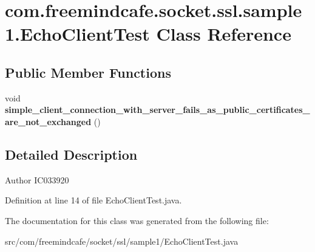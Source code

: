 \hypertarget{classcom_1_1freemindcafe_1_1socket_1_1ssl_1_1sample1_1_1_echo_client_test}{}\section{com.\+freemindcafe.\+socket.\+ssl.\+sample1.\+Echo\+Client\+Test Class Reference}
\label{classcom_1_1freemindcafe_1_1socket_1_1ssl_1_1sample1_1_1_echo_client_test}
\subsection*{Public Member Functions}
\begin{DoxyCompactItemize}
\item 
\hypertarget{classcom_1_1freemindcafe_1_1socket_1_1ssl_1_1sample1_1_1_echo_client_test_ac5ca3a64ce5bbcaeede960e119d10aa6}{}void {\bfseries simple\+\_\+client\+\_\+connection\+\_\+with\+\_\+server\+\_\+fails\+\_\+as\+\_\+public\+\_\+certificates\+\_\+are\+\_\+not\+\_\+exchanged} ()\label{classcom_1_1freemindcafe_1_1socket_1_1ssl_1_1sample1_1_1_echo_client_test_ac5ca3a64ce5bbcaeede960e119d10aa6}

\end{DoxyCompactItemize}


\subsection{Detailed Description}
\begin{DoxyAuthor}{Author}
I\+C033920 
\end{DoxyAuthor}


Definition at line 14 of file Echo\+Client\+Test.\+java.



The documentation for this class was generated from the following file\+:\begin{DoxyCompactItemize}
\item 
src/com/freemindcafe/socket/ssl/sample1/Echo\+Client\+Test.\+java\end{DoxyCompactItemize}
